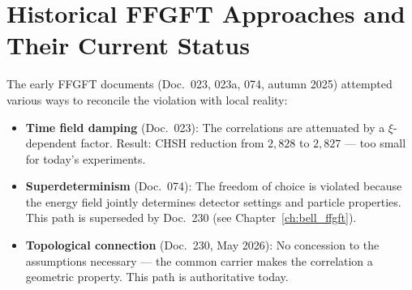 \section{Historical FFGFT Approaches and Their Current Status}

The early FFGFT documents (Doc.~023, 023a, 074, autumn 2025)
attempted various ways to reconcile the violation with local reality:

\begin{itemize}
  \item \textbf{Time field damping} (Doc.~023): The correlations
        are attenuated by a $\xi$-dependent factor.
        Result: CHSH reduction from $2{,}828$ to $2{,}827$ —
        too small for today's experiments.
  \item \textbf{Superdeterminism} (Doc.~074): The freedom of choice
        is violated because the energy field jointly determines detector settings
        and particle properties. This path
        is superseded by Doc.~230 (see Chapter~\ref{ch:bell_ffgft}).
  \item \textbf{Topological connection} (Doc.~230, May 2026):
        No concession to the assumptions necessary — the common
        carrier makes the correlation a geometric
        property. This path is authoritative today.
\end{itemize}

